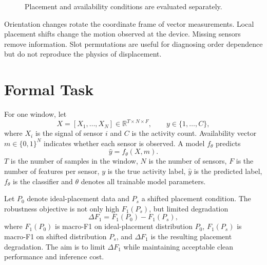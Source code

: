 \documentclass[12pt,a4paper,twoside,openright]{report}
\begin{document}
\begin{figure}[hbt!]
\centering
{}
\caption{Placement and availability conditions are evaluated separately.}
\label{fig:shift-types}
\end{figure}

Orientation changes rotate the coordinate frame of vector measurements. Local placement shifts change the motion observed at the device. Missing sensors remove information. Slot permutations are useful for diagnosing order dependence but do not reproduce the physics of displacement.

\section{Formal Task}
For one window, let
\[
X=[X_1,\ldots,X_N]\in\mathbb{R}^{T\times N\times F},
\qquad y\in\{1,\ldots,C\},
\]
where $X_i$ is the signal of sensor $i$ and $C$ is the activity count. Availability vector $m\in\{0,1\}^{N}$ indicates whether each sensor is observed. A model $f_\theta$ predicts
\[
\hat y=f_\theta(X,m).
\]
$T$ is the number of samples in the window, $N$ is the number of sensors, $F$ is the number of features per sensor, $y$ is the true activity label, $\hat y$ is the predicted label, $f_\theta$ is the classifier and $\theta$ denotes all trainable model parameters.

Let $P_0$ denote ideal-placement data and $P_s$ a shifted placement condition. The robustness objective is not only high $F_1(P_s)$, but limited degradation
\[
\Delta F_1=F_1(P_0)-F_1(P_s),
\]
where $F_1(P_0)$ is macro-F1 on ideal-placement distribution $P_0$, $F_1(P_s)$ is macro-F1 on shifted distribution $P_s$, and $\Delta F_1$ is the resulting placement degradation. The aim is to limit $\Delta F_1$ while maintaining acceptable clean performance and inference cost.
\end{document}
